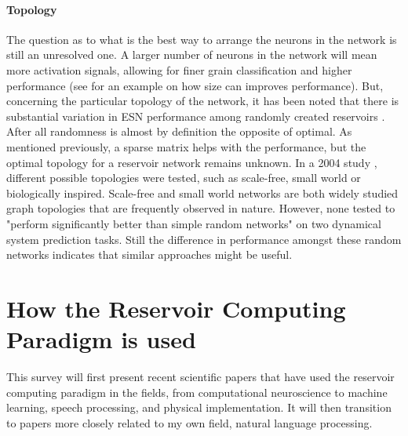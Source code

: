 \documentclass[12pt,oneside]{CUNY_CS_PhD}
\begin{document}
\subsubsection{Topology}
\label{topo}
The question as to what is the best way to arrange the neurons in the network is still an unresolved one. A larger number of neurons in the network will mean more activation signals, allowing for finer grain classification and higher performance (see \cite{triefenbach_phoneme_2010} for an example on how size can improves performance). But, concerning the particular topology of the network, it has been noted that there is substantial variation in ESN performance among randomly created reservoirs \cite{jiang2008supervised}. After all randomness is almost by definition the opposite of optimal. As mentioned previously, a sparse matrix helps with the performance, but the optimal topology for a reservoir network remains unknown. In a 2004 study \cite{Liebald2004}, different possible topologies were tested, such as scale-free, small world or biologically inspired. Scale-free and small world networks are both widely studied graph topologies that are frequently observed in nature. However, none tested to "perform significantly better than simple random networks" on two dynamical system prediction tasks. Still the difference in performance amongst these random networks indicates that similar approaches might be useful.


\chapter{How the Reservoir Computing Paradigm is used}
\label{lit}
This survey will first present recent scientific papers that have used the reservoir computing paradigm in the fields, from computational neuroscience to machine learning, speech processing, and physical implementation.
 It will then transition to papers more closely related to my own field, natural language processing.
\end{document}
